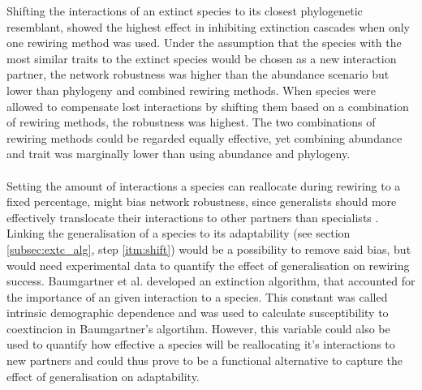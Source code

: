 \documentclass[12pt,a4paper]{article}
\begin{document}


 Shifting the interactions of an extinct species to its closest phylogenetic resemblant, showed the highest effect in inhibiting extinction cascades when only one rewiring method was used. Under the assumption that the species with the most similar traits to the extinct species would be chosen as a new interaction partner, the network robustness was higher than the abundance scenario but lower than phylogeny and combined rewiring methods. When species were allowed to compensate lost interactions by shifting them based on a combination of rewiring methods, the robustness was highest. The two combinations of rewiring methods could be regarded equally effective, yet combining abundance and trait was marginally lower than using abundance and phylogeny. \paragraph{}







%
Setting the amount of interactions a species can reallocate during rewiring to a fixed percentage, might bias network robustness, since generalists should more effectively translocate their interactions to other partners than specialists \parencite{Ramos-Jiliberto2012}. Linking the generalisation of a species to its adaptability (see section \ref{subsec:extc_alg}, step \ref{itm:shift}) would be a possibility to remove said bias, but would need experimental data to quantify the effect of generalisation on rewiring success. Baumgartner et al. \parencite{Baumgartner2020} developed an extinction algorithm, that accounted for the importance of an given interaction to a species. This constant was called intrinsic demographic dependence and was used to calculate susceptibility to coextincion in Baumgartner's algortihm. However, this variable could also be used to quantify how effective a species will be reallocating it's interactions to new partners and could thus prove to be a functional alternative to capture the effect of generalisation on adaptability. \paragraph{}
\end{document}
